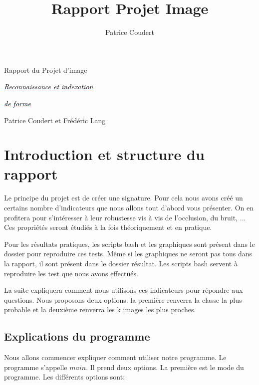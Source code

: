 \documentclass{report}
\title{Rapport Projet Image}
\author{Patrice Coudert}
\newcommand{\TextSoulign}[3]{\emph{\textcolor{#1}{\underline{#2\textcolor{black}{#3}}}}}
\begin{document}
\begin{titlepage}
	\begin{center}
		\vspace{5.5cm}
		\huge{Rapport du Projet d'image}
		\vspace{2cm}
		
		\Huge{\TextSoulign{red}{}{Reconnaissance et indexation}}

		\Huge{\TextSoulign{red}{}{de forme}}
		\vspace{8cm}
		
		\LARGE{Patrice Coudert et Frédéric Lang}
		\vspace{3.5cm}
		
	\end{center}
	
	
	
\end{titlepage}

\tableofcontents

\chapter*{Introduction et structure du rapport}

Le principe du projet est de créer une signature. Pour cela nous avons créé un certains nombre d'indicateurs
que nous allons tout d'abord vous présenter. On en profitera pour s'intéresser à leur robustesse vis à vis de l'occlusion, du bruit, ...
Ces propriétés seront étudiés à la fois théoriquement et en pratique.

Pour les résultats pratiques, les scripts bash et les graphiques sont présent dans le dossier pour reproduire ces tests. Même si les graphiques
ne seront pas tous dans la rapport, il sont présent dans le dossier résultat. Les scripts bash servent à reproduire les test que nous 
avons effectués.

La suite expliquera comment nous utilisons ces indicateurs pour répondre aux questions. Nous proposons deux options: la première renverra la classe
la plus probable et la deuxième renverra les k images les plus proches.

\section*{Explications du programme}

Nous allons commencer expliquer comment utiliser notre programme. Le programme s'appelle $main$. Il prend deux options. La première est
le mode du programme. Les différents options sont:
\end{document}
